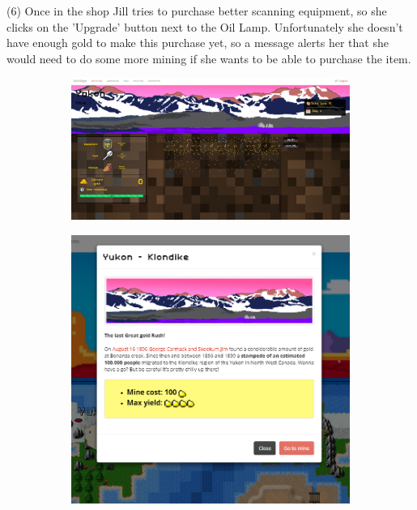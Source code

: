 \documentclass{mproj}
\begin{document}
(6) Once in the shop Jill tries to purchase better scanning equipment, so she clicks on the 'Upgrade' button next to the Oil Lamp. Unfortunately she doesn't have enough gold to make this purchase yet, so a message alerts her that she would need to do some more mining if she wants to be able to purchase the item.

\begin{figure}[!h]
        \centering
        \begin{subfigure} [h] {0.6\textwidth}
                \centering
                \includegraphics [width=1\textwidth] {yukon.png}
        \end{subfigure}
        \space
        \space
        \begin{subfigure} [h] {0.3\textwidth}
                \centering
                \includegraphics [width=1\textwidth] {yuki.png}
        \end{subfigure}
\end{figure}
\end{document}

